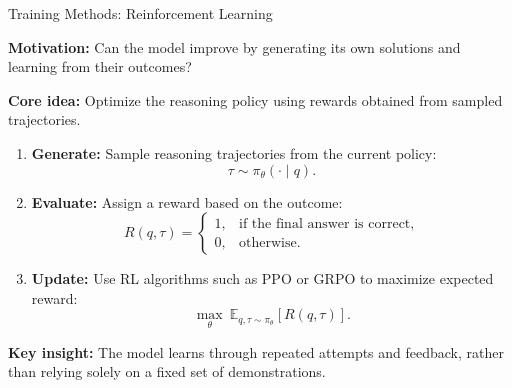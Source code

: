 \documentclass[aspectratio=169]{beamer}
\begin{document}
\begin{frame}{Training Methods: Reinforcement Learning}

\textbf{Motivation:} Can the model improve by generating its own solutions and learning from their outcomes?

\vspace{0.3cm}

\textbf{Core idea:} Optimize the reasoning policy using rewards obtained from sampled trajectories.

\begin{enumerate}
    \item \textbf{Generate:} Sample reasoning trajectories from the current policy:
    \[
    \tau \sim \pi_\theta(\cdot \mid q).
    \]

    \item \textbf{Evaluate:} Assign a reward based on the outcome:
    \[
    R(q,\tau)=
    \begin{cases}
        1, & \text{if the final answer is correct},\\
        0, & \text{otherwise}.
    \end{cases}
    \]

    \item \textbf{Update:} Use RL algorithms such as PPO or GRPO to maximize expected reward:
    \[
    \max_\theta \ \mathbb{E}_{q,\tau\sim\pi_\theta}[R(q,\tau)].
    \]
\end{enumerate}

\textbf{Key insight:} The model learns through repeated attempts and feedback, rather than relying solely on a fixed set of demonstrations.

\end{frame}
\end{document}
